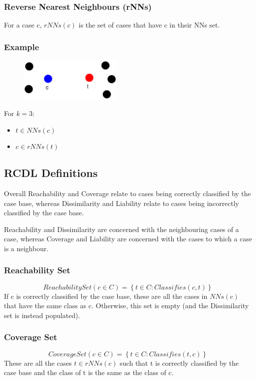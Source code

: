 \documentclass[a4paper,11pt]{report}
\begin{document}
\subsubsection{Reverse Nearest Neighbours (rNNs)}
For a case c, $ rNNs(c) $ is the set of cases that have c in their NNs set.

\subsubsection{Example}
\begin{figure}[h!]
\includegraphics[width=5cm]{./Drawn/RcdlNnRnnEg}
\end{figure}

For $k=3$:
\begin{itemize}
	\item $ t \in NNs(c) $
	\item $ c \in rNNs(t) $
\end{itemize}

\subsection{RCDL Definitions}
Overall Reachability and Coverage relate to cases being correctly classified by the case base, whereas Dissimilarity and Liability relate to cases being incorrectly classified by the case base.

Reachability and Dissimilarity are concerned with the neighbouring cases of a case, whereas Coverage and Liability are concerned with the cases to which a case is a neighbour.

\subsubsection{Reachability Set}
\[ ReachabilitySet(c \in C) = \left\lbrace t \in C : Classifies(c, t) \right\rbrace \] 
If c is correctly classified by the case base, these are all the cases in $ NNs(c) $ that have the same class as c. Otherwise, this set is empty (and the Dissimilarity set is instead populated).

\subsubsection{Coverage Set}
\[ CoverageSet(c \in C) = \left\lbrace t \in C : Classifies(t, c) \right\rbrace \]
These are all the cases $ t \in rNNs(c) $ such that t is correctly classified by the case base and the class of t is the same as the class of c.
\end{document}
